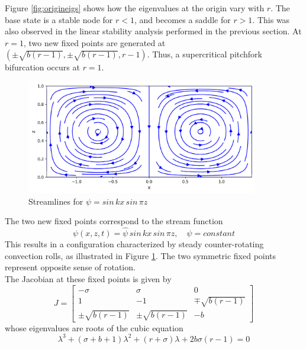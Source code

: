 \documentclass[paper=a4, fontsize=11pt]{scrartcl}
\numberwithin{equation}{section}		%
\numberwithin{figure}{section}			%
\numberwithin{table}{section}				%
\begin{document}
Figure \ref{fig:origineigs} shows how the eigenvalues at the origin vary with $r$. The base state is a stable node for $r < 1$, and becomes a saddle for $r > 1$. This was also observed in the linear stability analysis performed in the previous section. At $r = 1$, two new fixed points are generated at $(\pm \sqrt{b(r-1)}, \pm \sqrt{b(r-1)}, r-1)$. Thus, a supercritical pitchfork bifurcation occurs at $r=1$. \\

\begin{figure}[hbt!]
	\centering
	\includegraphics[width=0.9\textwidth]{media/streamlines.png}
	\caption{Streamlines for $\psi = sin \, kx \, sin \, \pi z$}
	\label{fig:streamlines}
\end{figure}

\noindent The two new fixed points correspond to the stream function 
\begin{equation}
	\psi(x,z,t) = \hat{\psi} \, sin \, kx \, sin \, \pi z, \quad \hat{\psi} = constant
\end{equation}
This results in a configuration characterized by steady counter-rotating convection rolls, as illustrated in Figure \ref{fig:streamlines}. The two symmetric fixed points represent opposite sense of rotation.\\

\noindent The Jacobian at these fixed points is given by 
\begin{equation}
	J =
	\begin{bmatrix}
		-\sigma & \sigma & 0 \\
		1 & -1 & \mp \sqrt{b(r-1)} \\
		\pm \sqrt{b(r-1)} & \pm \sqrt{b(r-1)} & -b
	\end{bmatrix}
\end{equation}
whose eigenvalues are roots of the cubic equation
\begin{equation}
	\lambda^3 + (\sigma + b + 1)\lambda^2 + (r + \sigma) \lambda + 2b\sigma(r-1) = 0
\end{equation}
\end{document}
